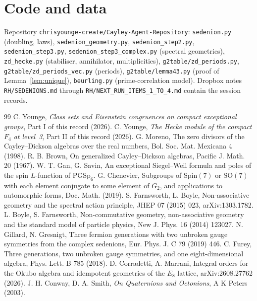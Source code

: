 \documentclass[11pt]{amsart}
\theoremstyle{definition}
\begin{document}
\appendix
\section{Code and data}
Repository \texttt{chrisyounge-create/Cayley-Agent-Repository}: \texttt{sedenion.py} (doubling, laws), \texttt{sedenion\_geometry.py}, \texttt{sedenion\_step2.py}, \texttt{sedenion\_step3.py}, \texttt{sedenion\_step3\_complex.py} (spectral geometries), \texttt{zd\_hecke.py} (stabiliser, annihilator, multiplicities), \texttt{g2table/zd\_periods.py}, \texttt{g2table/zd\_periods\_vec.py} (periods), \texttt{g2table/lemma43.py} (proof of Lemma~\ref{lem:unique}), \texttt{beurling.py} (prime-correlation model). Dropbox notes \texttt{RH/SEDENIONS.md} through \texttt{RH/NEXT\_RUN\_ITEMS\_1\_TO\_4.md} contain the session records.

\begin{thebibliography}{99}
 C. Younge, \emph{Class sets and Eisenstein congruences on compact exceptional groups}, Part I of this record (2026).
 C. Younge, \emph{The Hecke module of the compact $F_4$ at level~3}, Part II of this record (2026).
 G. Moreno, The zero divisors of the Cayley--Dickson algebras over the real numbers, Bol. Soc. Mat. Mexicana 4 (1998).
 R. B. Brown, On generalized Cayley--Dickson algebras, Pacific J. Math. 20 (1967).
 W. T. Gan, G. Savin, An exceptional Siegel--Weil formula and poles of the spin $L$-function of $\mathrm{PGSp}_6$.
 G. Chenevier, Subgroups of $\mathrm{Spin}(7)$ or $\mathrm{SO}(7)$ with each element conjugate to some element of $G_2$, and applications to automorphic forms, Doc. Math. (2019).
 S. Farnsworth, L. Boyle, Non-associative geometry and the spectral action principle, JHEP 07 (2015) 023, arXiv:1303.1782.
 L. Boyle, S. Farnsworth, Non-commutative geometry, non-associative geometry and the standard model of particle physics, New J. Phys. 16 (2014) 123027.
 N. Gillard, N. Gresnigt, Three fermion generations with two unbroken gauge symmetries from the complex sedenions, Eur. Phys. J. C 79 (2019) 446.
 C. Furey, Three generations, two unbroken gauge symmetries, and one eight-dimensional algebra, Phys. Lett. B 785 (2018).
 D. Corradetti, A. Marrani, Integral orders for the Okubo algebra and idempotent geometries of the $E_8$ lattice, arXiv:2608.27762 (2026).
 J. H. Conway, D. A. Smith, \emph{On Quaternions and Octonions}, A K Peters (2003).
\end{thebibliography}
\end{document}
